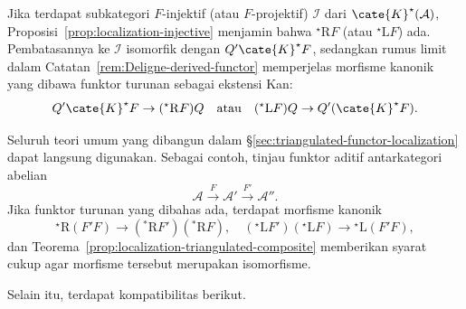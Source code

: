 Jika terdapat subkategori $F$-injektif (atau $F$-projektif) $\mathcal{I}$
dari $\cate{K}^\star(\mathcal{A})$,
Proposisi~\ref{prop:localization-injective} menjamin bahwa
${}^\star\mathrm{R}F$ (atau ${}^\star\mathrm{L}F$) ada. Pembatasannya ke
$\mathcal{I}$ isomorfik dengan $Q'\cate{K}^\star F$, sedangkan rumus limit
dalam Catatan~\ref{rem:Deligne-derived-functor} memperjelas morfisme kanonik
yang dibawa funktor turunan sebagai ekstensi Kan:
\begin{equation}\label{eqn:L-R-can}
	Q' \cate{K}^\star F \to ({}^\star \mathrm{R}F)Q \quad \text{atau} \quad ({}^\star \mathrm{L}F)Q \to Q' (\cate{K}^\star F).
\end{equation}

Seluruh teori umum yang dibangun dalam
\S\ref{sec:triangulated-functor-localization} dapat langsung digunakan.
Sebagai contoh, tinjau funktor aditif antarkategori abelian
\[ \mathcal{A} \xrightarrow{F} \mathcal{A}' \xrightarrow{F'} \mathcal{A}'' . \]
Jika funktor turunan yang dibahas ada, terdapat morfisme kanonik
\[ {}^\star \mathrm{R}(F'F) \to ({}^* \mathrm{R}F')({}^* \mathrm{R}F), \quad \left( {}^\star \mathrm{L}F' \right) \left( {}^\star \mathrm{L}F \right) \to {}^\star \mathrm{L}(F' F), \]
dan Teorema~\ref{prop:localization-triangulated-composite} memberikan syarat
cukup agar morfisme tersebut merupakan isomorfisme.

Selain itu, terdapat kompatibilitas berikut.

